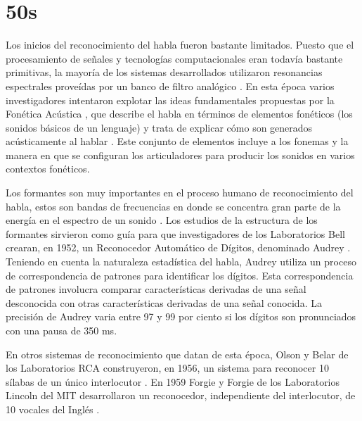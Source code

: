 \section{50s}
\label{sec:50s}

Los inicios del reconocimiento del habla fueron bastante limitados. Puesto que el procesamiento de se\~{n}ales y 
tecnolog\'{i}as computacionales eran todav\'{i}a bastante primitivas, la mayor\'{i}a de los sistemas desarrollados
utilizaron resonancias espectrales prove\'{i}das por un banco de filtro anal\'{o}gico \cite{Furui50Years2004}. 
En esta \'{e}poca varios investigadores intentaron
explotar las ideas fundamentales propuestas por la Fon\'{e}tica Ac\'{u}stica \cite{AnusuyaSpeech2009}, que
describe el habla en t\'{e}rminos de elementos fon\'{e}ticos (los sonidos b\'{a}sicos de un lenguaje) y trata de
explicar c\'{o}mo son generados ac\'{u}sticamente al hablar \cite{JuangAutomaticSpeech}. Este conjunto de elementos incluye a los
fonemas y la manera en que se configuran los articuladores para producir los sonidos en varios contextos fon\'{e}ticos.

Los formantes son muy importantes en el proceso humano de reconocimiento del habla, estos son bandas de frecuencias en 
donde se concentra gran parte de la energ\'{i}a en el espectro de un sonido \cite{HawkinsAcoustic2009}. Los estudios
de la estructura de los formantes sirvieron como gu\'{i}a para que investigadores de los Laboratorios Bell crearan, en 1952, 
un Reconocedor Autom\'{a}tico de D\'{i}gitos, denominado Audrey \cite{DavisAutomatic1952}. Teniendo en cuenta la naturaleza
estad\'{i}stica del habla, Audrey utiliza un proceso de correspondencia de patrones para identificar los d\'{i}gitos. Esta
correspondencia de patrones involucra comparar caracter\'{i}sticas derivadas de una se\~{n}al desconocida con
otras caracter\'{i}sticas derivadas de una se\~{n}al conocida. La precisi\'{o}n de Audrey varia entre 97 y 99 por ciento si
los d\'{i}gitos son pronunciados con una pausa de 350 ms.

En otros sistemas de reconocimiento que datan de esta \'{e}poca, Olson y Belar de los Laboratorios RCA construyeron, en 1956,
un sistema para reconocer 10 s\'{i}labas de un \'{u}nico interlocutor \cite{OlsonPhonetic1956}. En 1959 Forgie y Forgie de 
los Laboratorios Lincoln del MIT desarrollaron un reconocedor, independiente del interlocutor, de 10 vocales del
Ingl\'{e}s \cite{ForgieResults1959}.
